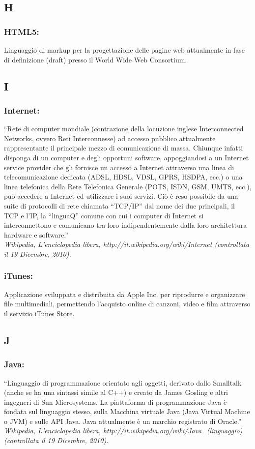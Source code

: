 \subsection*{\huge{H}}
\subsubsection*{HTML5:} Linguaggio di markup per la progettazione delle pagine
web attualmente in fase di definizione (draft) presso il World Wide Web Consortium.

\subsection*{\huge{I}}
\subsubsection*{Internet:}  ``Rete di computer mondiale (contrazione della
locuzione inglese Interconnected Networks, ovvero Reti Interconnesse) ad accesso pubblico
attualmente rappresentante il principale mezzo di comunicazione di massa.
Chiunque infatti disponga di un computer e degli opportuni software,
appoggiandosi a un Internet service provider che gli fornisce un accesso a
Internet attraverso una linea di telecomunicazione dedicata (ADSL, HDSL, VDSL,
GPRS, HSDPA, ecc.) o una linea telefonica della Rete Telefonica Generale (POTS,
ISDN, GSM, UMTS, ecc.), pu\`o accedere a Internet ed utilizzare i suoi servizi.
Ci\`o \`e reso possibile da una suite di protocolli di rete chiamata ``TCP/IP'' dal
nome dei due principali, il TCP e l'IP, la ``linguaQ'' comune con cui i computer
di Internet si interconnettono e comunicano tra loro indipendentemente dalla loro
architettura hardware e software.'' \\
\emph{Wikipedia, L'enciclopedia libera, http://it.wikipedia.org/wiki/Internet
(controllata il 19 Dicembre, 2010).}

\subsubsection*{iTunes:} Applicazione sviluppata e distribuita da Apple Inc. per
riprodurre e organizzare file multimediali, permettendo l'acquisto online di canzoni, video e
film attraverso il servizio iTunes Store.

\subsection*{\huge{J}}
\subsubsection*{Java:} ``Linguaggio di programmazione orientato agli oggetti,
derivato dallo Smalltalk (anche se ha una sintassi simile al C++) e creato da
James Gosling e altri ingegneri di Sun Microsystems. La piattaforma di
programmazione Java \`e fondata sul linguaggio stesso, sulla Macchina virtuale
Java (Java Virtual Machine o JVM) e sulle API Java. Java attualmente \`e un
marchio registrato di Oracle.''\\
\emph{Wikipedia, L'enciclopedia libera,
http://it.wikipedia.org/wiki/Java\_(linguaggio) (controllata il 19 Dicembre,
2010).}

